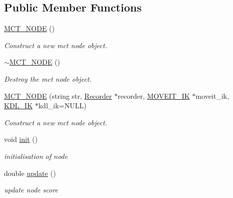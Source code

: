 \subsection*{Public Member Functions}
\begin{DoxyCompactItemize}
\item 
\mbox{\label{classMCT__NODE_a212e93de8fe4595fd9e4593331f25984}} 
\hyperlink{classMCT__NODE_a212e93de8fe4595fd9e4593331f25984}{M\+C\+T\+\_\+\+N\+O\+DE} ()
\begin{DoxyCompactList}\small\item\em Construct a new mct node object. \end{DoxyCompactList}\item 
\mbox{\label{classMCT__NODE_a4817d20c20a700b5c9024f86951532fd}} 
\hyperlink{classMCT__NODE_a4817d20c20a700b5c9024f86951532fd}{$\sim$\+M\+C\+T\+\_\+\+N\+O\+DE} ()
\begin{DoxyCompactList}\small\item\em Destroy the mct node object. \end{DoxyCompactList}\item 
\hyperlink{classMCT__NODE_a48aa593847730d011812896a11aa86e7}{M\+C\+T\+\_\+\+N\+O\+DE} (string str, \hyperlink{classRecorder}{Recorder} $\ast$recorder, \hyperlink{classMOVEIT__IK}{M\+O\+V\+E\+I\+T\+\_\+\+IK} $\ast$moveit\+\_\+ik, \hyperlink{classKDL__IK}{K\+D\+L\+\_\+\+IK} $\ast$kdl\+\_\+ik=N\+U\+LL)
\begin{DoxyCompactList}\small\item\em Construct a new mct node object. \end{DoxyCompactList}\item 
\mbox{\label{classMCT__NODE_a0862ea70bd023be109c0297c9f90e5f4}} 
void \hyperlink{classMCT__NODE_a0862ea70bd023be109c0297c9f90e5f4}{init} ()
\begin{DoxyCompactList}\small\item\em initialisation of node \end{DoxyCompactList}\item 
double \hyperlink{classMCT__NODE_a5adb70e08e5dac48147764d6922f6546}{update} ()
\begin{DoxyCompactList}\small\item\em update node score \end{DoxyCompactList}\item 

\end{DoxyCompactItemize}
